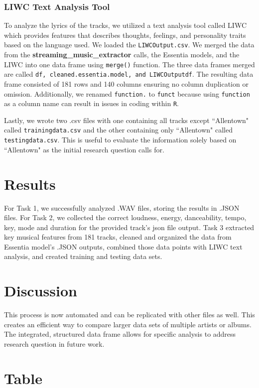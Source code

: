 \documentclass{article}\usepackage[]{graphicx}\usepackage[]{xcolor}
\begin{document}
\begin{multicols}{2}
\subsubsection{LIWC Text Analysis Tool}
To analyze the lyrics of the tracks, we utilized a text analysis tool called LIWC which provides features that describes thoughts, feelings, and personality traits based on the language used. We loaded the \texttt{LIWCOutput.csv}. We merged the data from the \textbf{streaming\_music\_extractor} calls, the Essentia models, and the LIWC into one data frame using \texttt{merge()} function. The three data frames merged are called \texttt{df, cleaned.essentia.model, and LIWCOutputdf}. The resulting data frame consisted of 181 rows and 140 columns ensuring no column duplication or omission. Additionally, we renamed \texttt{function.} to \texttt{funct} because using \texttt{function} as a column name can result in issues in coding within \texttt{R}. 

Lastly, we wrote two .csv files with one containing all tracks except ``Allentown" called \texttt{trainingdata.csv} and the other containing only ``Allentown" called \texttt{testingdata.csv}. This is useful to evaluate the information solely based on ``Allentown" as the initial research question calls for. 

\section{Results}
For Task 1, we successfully analyzed .WAV files, storing the results in .JSON files. For Task 2, we collected the correct loudness, energy, danceability, tempo, key, mode and duration for the provided track's json file output. Task 3 extracted key musical features from 181 tracks, cleaned and organized the data from Essentia model's .JSON outputs, combined those data points with LIWC text analysis, and created training and testing data sets\citep{Bogdanov}. 
\columnbreak
\section{Discussion}
 This process is now automated and can be replicated with other files as well. This creates an efficient way to compare larger data sets of multiple artists or albums. The integrated, structured data frame allows for specific analysis to address research question in future work. 
\end{multicols} %
\section{Table}
\end{document}
